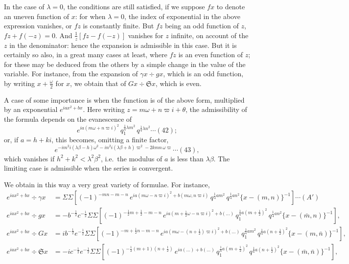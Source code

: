 \documentclass[12pt,a4paper]{article}
\newcommand{\fS}{\mathfrak{S}}
\newcommand{\mn}{(m,n)}
\newcommand{\mbn}{(\bar m,n)}
\newcommand{\mnb}{(m,\bar n)}
\newcommand{\mbnb}{(\bar m,\bar n)}
\begin{document}
In the case of $\lambda = 0$, the conditions are still satisfied, if we suppose $f x$ to denote an uneven function of $x$: for when $\lambda = 0$, the index of exponential in the above expression vanishes, or $f z$ is constantly finite. But $f z$ being an odd function of $z$, $f z + f(-z) = 0$. And $\tfrac{1}{z}[f z - f(-z)]$ vanishes for $z$ infinite, on account of the $z$ in the denominator: hence the expansion is admissible in this case. But it is certainly so also, in a great many cases at least, where $f z$ is an even function of $z$; for these may be deduced from the others by a simple change in the value of the variable. For instance, from the expansion of $\gamma x \div g x$, which is an odd function, by writing $x + \tfrac{\omega}{2}$ for $x$, we obtain that of $G x \div \fS x$, which is even.

A case of some importance is when the function is of the above form, multiplied by an exponential $e^{i a x^2 + b x}$. Here writing $z = m\omega + n\varpi i + \theta$, the admissibility of the formula depends on the evanescence of
\[
e^{i a(m\omega + n\varpi i)^2}\,q_1^{\frac{1}{4}\lambda m^2}\,q^{\frac{1}{4}\lambda n^2} \cdots(42);
\]
or, if $a = h + ki$, this becomes, omitting a finite factor,
\[
e^{-i m^2 i(\lambda\beta - h)\omega^2 - i n^2 i(\lambda\beta + h)\varpi^2 - 2 k m n\,\omega\varpi} \cdots(43),
\]
which vanishes if $h^2 + k^2 < \lambda^2\beta^2$, i.e.\ the modulus of $a$ is less than $\lambda\beta$. The limiting case is admissible when the series is convergent.

We obtain in this way a very great variety of formulae. For instance,
\begin{align*}
e^{iax^2 + bx}\div\gamma x &= \Sigma\Sigma\!\left[(-1)^{-mn-m-n}\,e^{i a(m\omega - n\varpi i)^2 + b(m\omega, n\varpi i)}\,q^{\frac{1}{4} a m^2}\,q^{\frac{1}{4} a n^2}\!\{x - \mn\}^{-1}\right] \cdots(A')\\
e^{iax^2 + bx}\div g x &= -b^{-\frac{1}{2}} c^{-\frac{1}{2}} \Sigma\Sigma\!\left[(-1)^{-\frac{1}{2}m+\frac{1}{2}-m-n}\,e^{i a(m+\frac{1}{2}\omega - n\varpi i)^2 + b(\ldots)}\,q_1^{\frac{1}{4} a (m+\frac{1}{2})^2}\,q^{\frac{1}{4} a n^2}\!\{x - \mbn\}^{-1}\right],\\
e^{iax^2 + bx}\div G x &= ib^{-\frac{1}{2}} e^{-\frac{1}{2}} \Sigma\Sigma\!\left[(-1)^{-m+\frac{1}{2}n-m-n}\,e^{i a(m\omega - (n+\frac{1}{2})\varpi i)^2 + b(\ldots)}\,q_1^{\frac{1}{4} a m^2}\,q^{\frac{1}{4} a (n+\frac{1}{2})^2}\!\{x - \mnb\}^{-1}\right],\\
e^{iax^2 + bx}\div \fS x &= -i c^{-\frac{1}{2}} e^{-\frac{1}{2}} \Sigma\Sigma\!\left[(-1)^{-\frac{1}{2}(m+1)(n+\frac{1}{2})}\,e^{i a(\ldots)+b(\ldots)}\,q_1^{\frac{1}{4} a (m+\frac{1}{2})^2}\,q^{\frac{1}{4} a (n+\frac{1}{2})^2}\!\{x - \mbnb\}^{-1}\right],
\end{align*}
\end{document}
